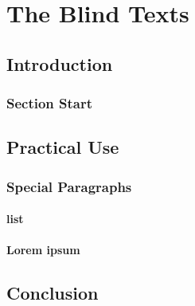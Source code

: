 \documentclass[a4paper]{memoir}
\begin{document}
\frontmatter
\tableofcontents

\mainmatter
\part{The Blind Texts}

\chapter{Introduction}

\section{Section Start}

\blindmathpaper

\chapter{Practical Use}

\section{Special Paragraphs}

\subsection{list}


\subsection{Lorem ipsum}

\blindtext[2]

\chapter{Conclusion}

\end{document}
